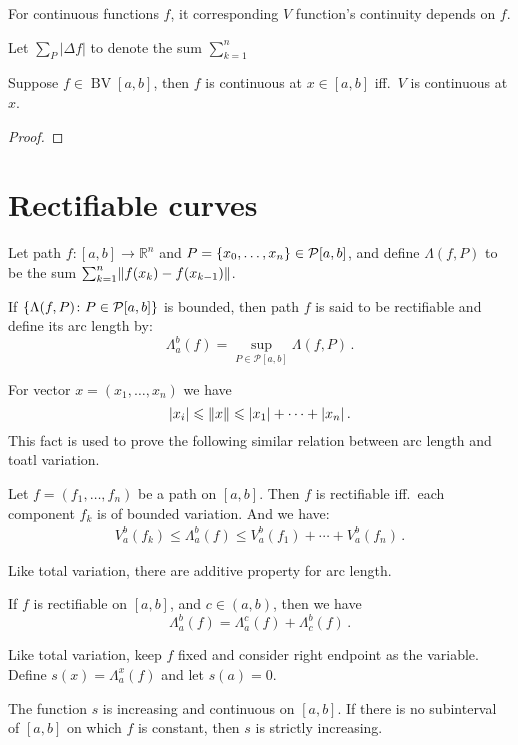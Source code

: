 \documentclass{article}
\renewcommand{\cal}{\mathcal}
\newcommand{\R}{\mathbb R}
\DeclarePairedDelimiter\set{\lbrace}{\rbrace}
\DeclarePairedDelimiter\norm{\lVert}{\rVert}
\DeclareMathOperator{\BV}{BV}
\begin{document}
For continuous functions $ f $, it corresponding $ V $ function's continuity depends on $ f $.

\begin{theorem}
    Let $ \sum_{P} |\Delta f| $ to denote the sum $ \sum_{k=1}^{n} $
\end{theorem}

\begin{theorem}
    Suppose $ f \in \BV[a, b] $, then $ f $ is continuous at $ x \in [a, b] $ iff.\ $ V $ is continuous at $ x $.
\end{theorem}

\begin{proof}
\end{proof}

\section{Rectifiable curves}
Let path $ f \colon [a, b] \to \R^n $ and $ P = \set{x_0, \dots, x_n} \in \mathcal{P}[a, b] $, and define $ \Lambda (f, P) $ to be the sum $ \sum_{k=1}^{n} \norm{f(x_{k}) - f (x_{k-1})} $.

\begin{definition}
    If $ \set{\Lambda(f, P) \colon P \in \cal P[a, b]} $ is bounded, then path $ f $ is said to be rectifiable and define its arc length by:
    \[ 
        \Lambda_{a}^{b}(f) = \sup_{P \in \cal P[a, b]} \Lambda(f, P) \,.
    \]
\end{definition}

For vector $ x = (x_1, \dots, x_n) $ we have
\[ 
    |x_i| \leqslant \norm{x} \leqslant |x_1| + \cdots + |x_n| \,.
\]
This fact is used to prove the following similar relation between arc length and toatl variation.

\begin{theorem}
    Let $ f = (f_1, \dots, f_n) $ be a path on $ [a, b] $. Then $ f $ is rectifiable iff.\ each component $ f_k $ is of bounded variation. And we have:
    \begin{align} \label{eq:arclength}
        V_a^b (f_k) \leqslant \Lambda_a^b (f) \leqslant V_a^b (f_1) + \cdots + V_a^b (f_n) \,.
    \end{align}
\end{theorem}

Like total variation, there are additive property for arc length.

\begin{theorem}
    If $ f $ is rectifiable on $ [a, b] $, and $ c \in (a, b) $, then we have
    \[ 
        \Lambda_a^b (f) = \Lambda_a^c (f) + \Lambda_c^b (f) \,.
    \]
\end{theorem}

Like total variation, keep $ f $ fixed and consider right endpoint as the variable. Define $ s(x) = \Lambda_a^x (f) $ and let $ s(a) = 0 $.

\begin{theorem}
    The function $ s $ is increasing and continuous on $ [a, b] $. If there is no subinterval of $ [a, b] $ on which $ f $ is constant, then $ s $ is strictly increasing.
\end{theorem}
\end{document}

